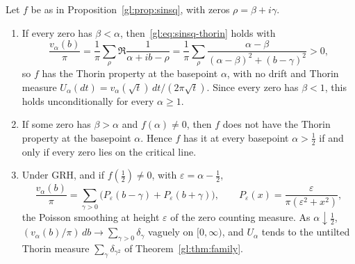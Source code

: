 \begin{theorem}\label{gl:thm:sinsq}
Let $f$ be as in Proposition~\ref{gl:prop:sinsq}, with zeros $\rho=\beta+i\gamma$.
\begin{enumerate}
\item[(a)] If every zero has $\beta<\alpha$, then~\eqref{gl:eq:sinsq-thorin} holds with
\[
\frac{v_\alpha(b)}\pi=\frac1\pi\sum_\rho\Re\frac{1}{\alpha+ib-\rho}=\frac1\pi\sum_\rho\frac{\alpha-\beta}{(\alpha-\beta)^2+(b-\gamma)^2}>0,
\]
so $f$ has the Thorin property at the basepoint $\alpha$, with no drift and Thorin measure $U_\alpha(dt)=v_\alpha(\sqrt t)\,dt/(2\pi\sqrt t)$. Since every zero has $\beta<1$, this holds unconditionally for every $\alpha\ge1$.
\item[(b)] If some zero has $\beta>\alpha$ and $f(\alpha)\neq0$, then $f$ does not have the Thorin property at the basepoint $\alpha$. Hence $f$ has it at every basepoint $\alpha>\tfrac12$ if and only if every zero lies on the critical line.
\item[(c)] Under GRH, and if $f(\tfrac12)\ne0$, with $\varepsilon=\alpha-\tfrac12$,
\[
\frac{v_\alpha(b)}\pi=\sum_{\gamma>0}\big(P_\varepsilon(b-\gamma)+P_\varepsilon(b+\gamma)\big),\qquad P_\varepsilon(x)=\frac{\varepsilon}{\pi(\varepsilon^2+x^2)},
\]
the Poisson smoothing at height $\varepsilon$ of the zero counting measure. As $\alpha\downarrow\tfrac12$, $(v_\alpha(b)/\pi)\,db\to\sum_{\gamma>0}\delta_\gamma$ vaguely on $[0,\infty)$, and $U_\alpha$ tends to the untilted Thorin measure $\sum_\gamma\delta_{\gamma^2}$ of Theorem~\ref{gl:thm:family}.
\end{enumerate}
\end{theorem}

